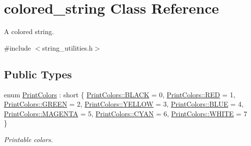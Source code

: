 \hypertarget{classcolored__string}{}\section{colored\+\_\+string Class Reference}
\label{classcolored__string}


A colored string.  




{\ttfamily \#include $<$string\+\_\+utilities.\+h$>$}

\subsection*{Public Types}
\begin{DoxyCompactItemize}
\item 
enum \mbox{\hyperlink{classcolored__string_a76416a7db18c947e5a6d5bf17c78e497}{Print\+Colors}} \+: short \{ \newline
\mbox{\hyperlink{classcolored__string_a76416a7db18c947e5a6d5bf17c78e497a08d0012388564e95c3b4a7407cf04965}{Print\+Colors\+::\+B\+L\+A\+CK}} = 0, 
\mbox{\hyperlink{classcolored__string_a76416a7db18c947e5a6d5bf17c78e497aa2d9547b5d3dd9f05984475f7c926da0}{Print\+Colors\+::\+R\+ED}} = 1, 
\mbox{\hyperlink{classcolored__string_a76416a7db18c947e5a6d5bf17c78e497a9de0e5dd94e861317e74964bed179fa0}{Print\+Colors\+::\+G\+R\+E\+EN}} = 2, 
\mbox{\hyperlink{classcolored__string_a76416a7db18c947e5a6d5bf17c78e497a8a568e5f41b7e4da88fe5c4a00aad34e}{Print\+Colors\+::\+Y\+E\+L\+L\+OW}} = 3, 
\newline
\mbox{\hyperlink{classcolored__string_a76416a7db18c947e5a6d5bf17c78e497a1b3e1ee9bff86431dea6b181365ba65f}{Print\+Colors\+::\+B\+L\+UE}} = 4, 
\mbox{\hyperlink{classcolored__string_a76416a7db18c947e5a6d5bf17c78e497ac634ffea7195608364671ac52ee59a61}{Print\+Colors\+::\+M\+A\+G\+E\+N\+TA}} = 5, 
\mbox{\hyperlink{classcolored__string_a76416a7db18c947e5a6d5bf17c78e497a344dd8cd533280795b9db82ef0c92749}{Print\+Colors\+::\+C\+Y\+AN}} = 6, 
\mbox{\hyperlink{classcolored__string_a76416a7db18c947e5a6d5bf17c78e497ab5bf627e448384cf3a4c35121ca6008d}{Print\+Colors\+::\+W\+H\+I\+TE}} = 7
 \}
\begin{DoxyCompactList}\small\item\em Printable colors. \end{DoxyCompactList}\end{DoxyCompactItemize}
